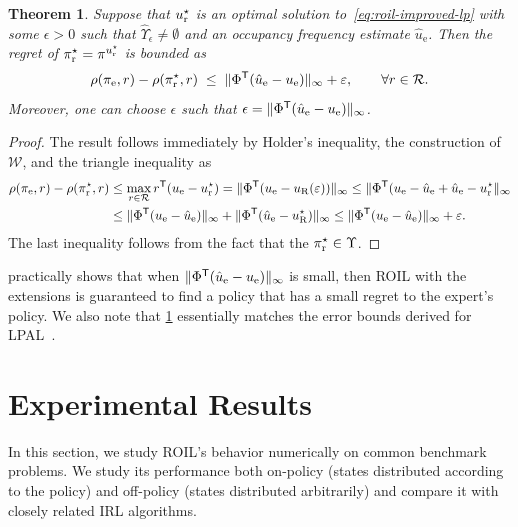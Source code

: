 \documentclass[10pt]{article}
\renewcommand{\cite}{\citep}
\theoremstyle{plain}
\newtheorem{theorem}{Theorem}
\theoremstyle{remark}
\begin{document}
\begin{theorem} \label{roilRegretBound}
Suppose that $u_{\mathrm{r}}^{\mathnormal{\star}}$ is an optimal solution to~\eqref{eq:roil-improved-lp} with some $\epsilon>0$ such that $\hat{\Upsilon}_{\epsilon} \neq \emptyset$ and an occupancy frequency estimate $\hat{u}_{\mathrm{e}}$. Then the regret of $\pi_{\mathrm{r}}^{\mathnormal{\star}}  = \pi^{u^{\mathnormal{\star}}_{\mathrm{r}}}$ is bounded as
\[
\rho(\pi_{\mathrm{e}}, r) - \rho(\pi_{\mathrm{r}}^{\mathnormal{\star}}, r)
\;\leq\;
\| \Phi^{\mathsf{T}} (\hat{u}_{\mathrm{e}} - u_{\mathrm{e}}) \|_\infty + \varepsilon,
\qquad \forall r\in \mathcal{R}.
\]
Moreover, one can choose $\epsilon$ such that $ \epsilon = \| \Phi^{\mathsf{T}} (\hat{u}_{\mathrm{e}} - u_{\mathrm{e}}) \|_\infty$.
\end{theorem}
\begin{proof}
The result follows immediately by Holder's inequality, the construction of $\mathcal{W}$, and the triangle inequality as
\begin{align*}
\rho(\pi_{\mathrm{e}}, r) - \rho(\pi_{\mathrm{r}}^{\mathnormal{\star}}, r)
  &\le  \max_{r\in\mathcal{R}} r^{\mathsf{T}}(u_{\mathrm{e}} - u_{\mathrm{r}}^{\mathnormal{\star}})
    = \| \Phi^{\mathsf{T}} (u_{\mathrm{e}} - u_{\mathrm{R}}(\varepsilon)) \|_\infty
    \leq \| \Phi^{\mathsf{T}} (u_{\mathrm{e}} - \hat{u}_{\mathrm{e}} + \hat{u}_{\mathrm{e}} - u_{\mathrm{r}}^{\mathnormal{\star}} \|_\infty \\
&\leq \| \Phi^{\mathsf{T}} (u_{\mathrm{e}}-\hat{u}_{\mathrm{e}}) \|_\infty + \| \Phi^{\mathsf{T}} (\hat{u}_{\mathrm{e}} - u_{\mathrm{R}}^{\mathnormal{\star}}) \|_\infty \leq  \| \Phi^{\mathsf{T}} (u_{\mathrm{e}}-\hat{u}_{\mathrm{e}}) \|_\infty + \varepsilon.
\end{align*}
The last inequality follows from the fact that the $\pi_{\mathrm{r}}^{\mathnormal{\star}}  \in \Upsilon$.
\end{proof}

 practically shows that when $\| \Phi^{\mathsf{T}} (\hat{u}_{\mathrm{e}} - u_{\mathrm{e}}) \|_\infty $ is small, then ROIL with the extensions is guaranteed to find a policy that has a small regret to the expert's policy. We also note that \cref{roilRegretBound} essentially matches the error bounds derived for LPAL~\cite{Syed2008}.


\section{Experimental Results}
\label{sec:experimental-results}


In this section, we study ROIL's behavior numerically on common benchmark problems. We study its performance both on-policy (states distributed according to the policy) and off-policy (states distributed arbitrarily) and compare it with closely related IRL algorithms.
\end{document}
